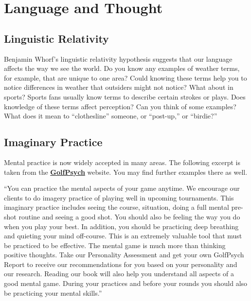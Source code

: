 \documentclass[
]{book}
\begin{document}
\hypertarget{language-and-thought}{%
\section{Language and Thought}\label{language-and-thought}}

\hypertarget{linguistic-relativity}{%
\subsection*{Linguistic Relativity}\label{linguistic-relativity}}

Benjamin Whorf's linguistic relativity hypothesis suggests that our language affects the way we see the world. Do you know any examples of weather terms, for example, that are unique to one area? Could knowing these terms help you to notice differences in weather that outsiders might not notice? What about in sports? Sports fans usually know terms to de­scribe certain strokes or plays. Does knowledge of these terms affect percep­tion? Can you think of some examples? What does it mean to ``clothesline'' someone, or ``post-up,'' or ``birdie?''

\hypertarget{imaginary-practice}{%
\subsection*{Imaginary Practice}\label{imaginary-practice}}

Mental practice is now widely accepted in many areas. The following excerpt is taken from the \href{https://www.golfpsych.com}{\textbf{GolfPsych}} website. You may find further examples there as well.

``You can practice the mental aspects of your game anytime. We encourage our clients to do imagery practice of playing well in upcoming tournaments. This imaginary practice includes seeing the course, situation, doing a full mental pre-shot routine and seeing a good shot. You should also be feeling the way you do when you play your best. In addition, you should be practicing deep breathing and quieting your mind off-course. This is an extremely valuable tool that must be practiced to be effective. The mental game is much more than thinking positive thoughts. Take our Personality Assessment and get your own GolfPsych Report to receive our recommendations for you based on your personality and our research. Reading our book will also help you understand all aspects of a good mental game. During your practices and before your rounds you should also be practicing your mental skills.''
\end{document}
